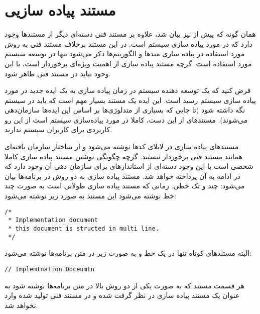 

\section{مستند پیاده سازیی}
همان گونه که پیش از نیز بیان شد، علاوه بر مستند فنی دسته‌ای دیگر از مستندها وجود دارد که در مورد 
پیاده سازی سیستم است. در این مستند برخلاف مستند فنی به روش مورد استفاده در پیاده سازی متدها و 
الگوریتم‌ها ذکر می‌شود تنها در توسعه سیستم مورد استفاده است. گرچه مستند پیاده سازی از اهمیت ویژه‌ای
برخوردار است، با این وحود نباید در مستند فنی ظاهر شود.

فرض کنید که یک توسعه دهنده سیستم در زمان پیاده سازی به یک ایده جدید در مورد پیاده سازی سیستم 
رسید است. این ایده یک مستند بسیار مهم است که باید در سیستم نگه داشته شود (تا جایی که بسیاری
از متدلوژی‌ها بر اساس این ایده‌ها سازمان‌دهی می‌شوند). مستندهای از این دست، کاملا در مورد پیاده‌سازی
سیستم است از این رو کاربردی برای کاربران سیستم ندارند.

مستندهای پیاده سازی در لابلای کدها نوشته می‌شود و از ساختار سازمان یافته‌ای همانند مستند فنی برخوردار
نیستند. گرچه چگونگی نوشتن مستند پیاده سازی کاملا شخصی است با این وجود دسته‌ای از استاندارهای برای سازمان
دهی آن وچود دارد که در ادامه به آن پرداخته خواهد شد.
مستند پیاده سازی به دو روش در برنامه‌ها بیان می‌شود: چند و تک خطی. زمانی که مستند پیاده سازی طولانی
است به صورت چند خط نوشته می‌شود این مستند به صورد زیر نوشته می‌شود:
 
\begin{latin}
\lstset{language=C++}
\begin{lstlisting}[frame=single] 
/*
 * Implementation document
 * this document is structed in multi line.
 */
\end{lstlisting}
\end{latin}

البته مستندهای کوتاه تنها در یک خط و به صورت زیر در متن برنامه‌ها نوشته می‌شود:

\begin{latin}
\lstset{language=C++}
\begin{lstlisting}[frame=single] 
// Implemtnation Doceumtn
\end{lstlisting}
\end{latin}

هر قسمت مستند که به صورت یکی از دو روش بالا در متن برنامه‌ها نوشته شود به عنوان یک مستند پیاده سازی
در نظر گرفت شده و در مستند فنی تولید شده وارد نخواهد شد.

